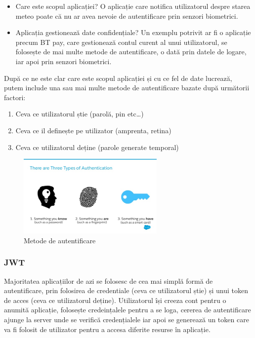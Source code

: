 \documentclass[12pt]{article}
\begin{document}
\begin{itemize}
    \item Care este scopul aplicației? O aplicație care notifica utilizatorul despre starea meteo poate 
    că nu ar avea nevoie de autentificare prin senzori biometrici. 
    \item Aplicația gestionează date confidențiale? Un exemplu potrivit ar fi o aplicație precum BT pay, care gestionează 
    contul curent al unui utilizatorul,
    se folosește de mai multe metode de autentificare, o dată prin datele de logare, iar apoi
    prin senzori biometrici.
\end{itemize}

După ce ne este clar care este scopul aplicației și cu ce fel de date lucrează, 
putem include una sau mai multe metode de autentificare bazate după următorii
factori:

\begin{enumerate}
    \item Ceva ce utilizatorul știe (parolă, pin etc\dots)
    \item Ceva ce il definește pe utilizator (amprenta, retina)
    \item Ceva ce utilizatorul deține (parole generate temporal)
\end{enumerate}

\begin{figure}[H]
\centering
\includegraphics[height=4cm]{3ways.jpg}
\caption{Metode de autentificare \cite{3ways-auth}}
\end{figure}

\subsubsection{JWT}

Majoritatea aplicațiilor de azi se folosesc de cea mai simplă formă de autentificare,
prin folosirea de credentiale (ceva ce utilizatorul știe) și unui token de acces (ceva
ce utilizatorul deține). Utilizatorul își creeza cont pentru o anumită aplicație, folosește
credeințalele pentru a se loga, cererea de autentificare ajunge la server unde se verifică
credențialele iar apoi se generează un token care va fi folosit de utilizator pentru a accesa
diferite resurse în aplicație.
\end{document}
